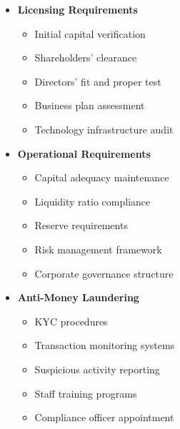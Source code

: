 \begin{tcolorbox}[
    colback=white,
    colframe=primarydark,
    title=\textbf{Central Bank of Nigeria (CBN) Requirements},
    before skip=1em,
    after skip=1em
]
    \begin{itemize}[leftmargin=*,itemsep=0.5em]
        \item \textbf{Licensing Requirements}
        \begin{itemize}[itemsep=0.3em]
            \item Initial capital verification
            \item Shareholders' clearance
            \item Directors' fit and proper test
            \item Business plan assessment
            \item Technology infrastructure audit
        \end{itemize}

        \vspace{0.5em}

        \item \textbf{Operational Requirements}
        \begin{itemize}[itemsep=0.3em]
            \item Capital adequacy maintenance
            \item Liquidity ratio compliance
            \item Reserve requirements
            \item Risk management framework
            \item Corporate governance structure
        \end{itemize}

        \vspace{0.5em}

        \item \textbf{Anti-Money Laundering}
        \begin{itemize}[itemsep=0.3em]
            \item KYC procedures
            \item Transaction monitoring systems
            \item Suspicious activity reporting
            \item Staff training programs
            \item Compliance officer appointment
        \end{itemize}

        \vspace{0.5em}


\end{itemize}
\end{tcolorbox}
